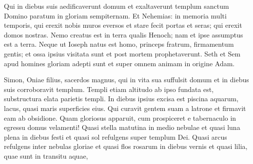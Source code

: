 \begin{biblechapter}
\begin{biblechapter}
\begin{biblechapter}
\begin{biblechapter}
\begin{biblechapter}
\begin{biblechapter}
\begin{biblechapter}
\begin{biblechapter}
\begin{biblechapter}
\begin{biblechapter}
\begin{biblechapter}
\begin{biblechapter}
\begin{biblechapter}
\begin{biblechapter}
\begin{biblechapter}
\begin{biblechapter}
\begin{biblechapter}
\begin{biblechapter}
\begin{biblechapter}
\begin{biblechapter}
\begin{biblechapter}
\begin{biblechapter}
\begin{biblechapter}
\begin{biblechapter}
\begin{biblechapter}
\begin{biblechapter}
\begin{biblechapter}
\begin{biblechapter}
\begin{biblechapter}
\begin{biblechapter}
\begin{biblechapter}
\begin{biblechapter}
\begin{biblechapter}
\begin{biblechapter}
\begin{biblechapter}
\begin{biblechapter}
\begin{biblechapter}
\begin{biblechapter}
\begin{biblechapter}
\begin{biblechapter}
\begin{biblechapter}
\begin{biblechapter}
\begin{biblechapter}
\begin{biblechapter}
\begin{biblechapter}
\begin{biblechapter}
\begin{biblechapter}
\begin{biblechapter}
\begin{biblechapter}
 Qui in diebus suis aedificaverunt domum
 et exaltaverunt templum sanctum Domino
 paratum in gloriam sempiternam.
 \verse Et Nehemias: in memoria multi temporis,
 qui erexit nobis muros eversos
 et stare fecit portas et seras;
 qui erexit domos nostras.
 \verse Nemo creatus est in terra qualis Henoch;
 nam et ipse assumptus est a terra.
 \verse Neque ut Ioseph natus est homo,
 princeps fratrum, firmamentum gentis;
 \verse et ossa ipsius visitata sunt
 et post mortem prophetaverunt.
 \verse Seth et Sem apud homines gloriam adepti sunt
 et super omnem animam in origine Adam.
 
\begin{biblechapter}
\verse Simon, Oniae filius, sacerdos magnus,
 qui in vita sua suffulsit domum
 et in diebus suis corroboravit templum.
 \verse Templi etiam altitudo ab ipso fundata est,
 substructura elata parietis templi.
 \verse In diebus ipsius excisa est piscina aquarum,
 lacus, quasi maris superficies eius.
 \verse Qui curavit gentem suam a latrone
 et firmavit eam ab obsidione.
 \verse Quam gloriosus apparuit, cum prospiceret e tabernaculo
 in egressu domus velamenti!
 \verse Quasi stella matutina in medio nebulae
 et quasi luna plena in diebus festi
 \verse et quasi sol refulgens super templum Dei.
 \verse Quasi arcus refulgens inter nebulas gloriae
 et quasi flos rosarum in diebus vernis
 et quasi lilia, quae sunt in transitu aquae,

\end{biblechapter}
\end{biblechapter}
\end{biblechapter}
\end{biblechapter}
\end{biblechapter}
\end{biblechapter}
\end{biblechapter}
\end{biblechapter}
\end{biblechapter}
\end{biblechapter}
\end{biblechapter}
\end{biblechapter}
\end{biblechapter}
\end{biblechapter}
\end{biblechapter}
\end{biblechapter}
\end{biblechapter}
\end{biblechapter}
\end{biblechapter}
\end{biblechapter}
\end{biblechapter}
\end{biblechapter}
\end{biblechapter}
\end{biblechapter}
\end{biblechapter}
\end{biblechapter}
\end{biblechapter}
\end{biblechapter}
\end{biblechapter}
\end{biblechapter}
\end{biblechapter}
\end{biblechapter}
\end{biblechapter}
\end{biblechapter}
\end{biblechapter}
\end{biblechapter}
\end{biblechapter}
\end{biblechapter}
\end{biblechapter}
\end{biblechapter}
\end{biblechapter}
\end{biblechapter}
\end{biblechapter}
\end{biblechapter}
\end{biblechapter}
\end{biblechapter}
\end{biblechapter}
\end{biblechapter}
\end{biblechapter}
\end{biblechapter}
